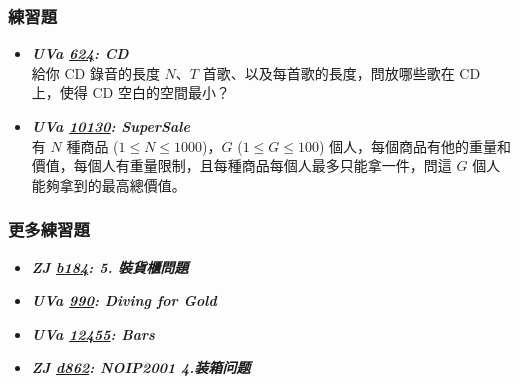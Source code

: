 \subsubsection*{練習題}
\begin{itemize}[label={\Checkmark}]
\item \textbf{\textit{UVa \href{http://uva.onlinejudge.org/external/6/624.html}{624}: CD}}\\
給你 CD 錄音的長度 $N$、$T$ 首歌、以及每首歌的長度，問放哪些歌在 CD 上，使得 CD 空白的空間最小？
\item \textbf{\textit{UVa \href{http://uva.onlinejudge.org/external/101/10130.html}{10130}: SuperSale}}\\
有 $N$ 種商品 ($1\leq{N}\leq{1000}$)，$G$ ($1\leq{G}\leq{100}$) 個人，每個商品有他的重量和價值，每個人有重量限制，且每種商品每個人最多只能拿一件，問這 $G$ 個人能夠拿到的最高總價值。
\end{itemize}
\subsubsection*{更多練習題}
\begin{itemize}[label={\PencilLeftDown}]
\item \textbf{\textit{ZJ \href{http://zerojudge.tw/ShowProblem?problemid=b184}{b184}: 5. 裝貨櫃問題}}
\item \textbf{\textit{UVa \href{http://uva.onlinejudge.org/external/9/990.html}{990}: Diving for Gold}}
\item \textbf{\textit{UVa \href{http://uva.onlinejudge.org/external/124/12455.html}{12455}: Bars}}
\item \textbf{\textit{ZJ \href{http://zerojudge.tw/ShowProblem?problemid=d862}{d862}: NOIP2001 4.装箱问题}}
\end{itemize}